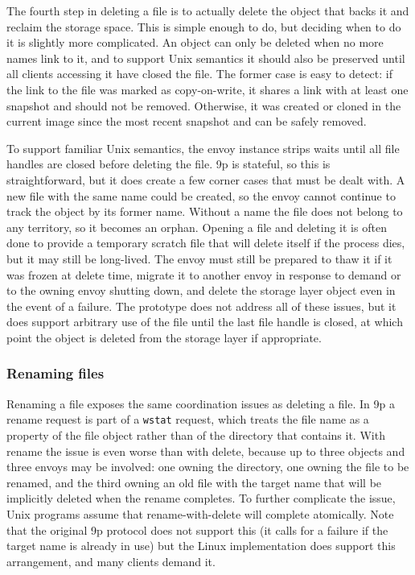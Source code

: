 The fourth step in deleting a file is to actually delete the object that backs it and reclaim the storage space. This is simple enough to do, but deciding when to do it is slightly more complicated. An object can only be deleted when no more names link to it, and to support Unix semantics it should also be preserved until all clients accessing it have closed the file. The former case is easy to detect: if the link to the file was marked as copy-on-write, it shares a link with at least one snapshot and should not be removed. Otherwise, it was created or cloned in the current image since the most recent snapshot and can be safely removed.

To support familiar Unix semantics, the envoy instance strips waits until all file handles are closed before deleting the file. 9p is stateful, so this is straightforward, but it does create a few corner cases that must be dealt with. A new file with the same name could be created, so the envoy cannot continue to track the object by its former name. Without a name the file does not belong to any territory, so it becomes an orphan. Opening a file and deleting it is often done to provide a temporary scratch file that will delete itself if the process dies, but it may still be long-lived. The envoy must still be prepared to thaw it if it was frozen at delete time, migrate it to another envoy in response to demand or to the owning envoy shutting down, and delete the storage layer object even in the event of a failure. The prototype does not address all of these issues, but it does support arbitrary use of the file until the last file handle is closed, at which point the object is deleted from the storage layer if appropriate.

\subsubsection{Renaming files}\label{sec:rename-operation}

Renaming a file exposes the same coordination issues as deleting a file. In 9p a rename request is part of a \texttt{wstat} request, which treats the file name as a property of the file object rather than of the directory that contains it. With rename the issue is even worse than with delete, because up to three objects and three envoys may be involved: one owning the directory, one owning the file to be renamed, and the third owning an old file with the target name that will be implicitly deleted when the rename completes. To further complicate the issue, Unix programs assume that rename-with-delete will complete atomically. Note that the original 9p protocol does not support this (it calls for a failure if the target name is already in use) but the Linux implementation does support this arrangement, and many clients demand it.

